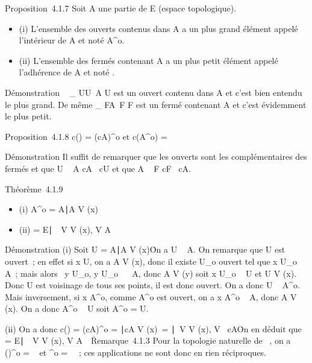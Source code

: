 \documentclass[]{article}
\begin{document}
Proposition~4.1.7 Soit A une partie de E (espace topologique).

\begin{itemize}
\itemsep1pt\parskip0pt
\item
  (i) L'ensemble des ouverts contenus dans A a un plus grand élément
  appelé l'intérieur de A et noté A^o.
\item
  (ii) L'ensemble des fermés contenant A a un plus petit élément appelé
  l'adhérence de A et noté \overlineA.
\end{itemize}

Démonstration \⋃ ~
_ U\textouvert \atop U\subset~A U
est un ouvert contenu dans A et c'est bien entendu le plus grand. De
même \⋂  _
F \atop A\subset~F F est un
fermé contenant A et c'est évidemment le plus petit.

Proposition~4.1.8 c(\overlineA) = (cA)^o
et c(A^o) = \overlinecA

Démonstration Il suffit de remarquer que les ouverts sont les
complémentaires des fermés et que U \subset~ A \Leftrightarrow cA
\subset~cU et que A \subset~ F \Leftrightarrow cF \subset~cA.

Théorème~4.1.9

\begin{itemize}
\itemsep1pt\parskip0pt
\item
  (i) A^o = \x \in
  A∣A \in V (x)\
\item
  (ii) \overlineA = \x \in
  E∣\forall~~V \in V (x), V \bigcap
  A\neq~\varnothing~\
\end{itemize}

Démonstration (i) Soit U = \x \in
A∣A \in V (x)\. On a U \subset~ A. On
remarque que U est ouvert~; en effet si x \in U, on a A \in V (x), donc il
existe U_o ouvert tel que x \in U_o \subset~ A~; mais alors
\forall~y \in U_o, y \in U_o~ \subset~ A, donc
A \in V (y) soit x \in U_o \subset~ U et U \in V (x). Donc U est voisinage
de tous ses points, il est donc ouvert. On a donc U \subset~ A^o.
Mais inversement, si x \in A^o, comme A^o est
ouvert, on a x \in A^o \subset~ A, donc A \in V (x). On a donc
A^o \subset~ U soit A^o = U.

(ii) On a donc c(\overlineA) = (cA)^o =
\x∣cA \in V
(x)\ =
\x∣\exists~V
\in V (x), V \subset~cA\. On en déduit que
\overlineA = \x \in
E∣\forall~~V \in V (x), V \bigcap
A\neq~\varnothing~\.

Remarque~4.1.3 Pour la topologie naturelle de ~, on a
()^o = ~ et
\overlineℚ^o = \varnothing~~; ces applications ne
sont donc en rien réciproques.
\end{document}
